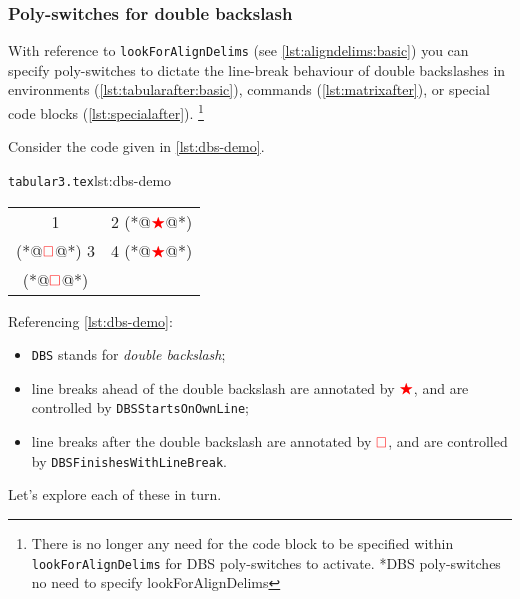 \subsubsection{Poly-switches for double backslash}\label{subsec:dbs}
 With reference to \texttt{lookForAlignDelims} (see \vref{lst:aligndelims:basic})
  you can specify poly-switches to
 dictate the line-break behaviour of double backslashes in environments
 (\vref{lst:tabularafter:basic}), commands (\vref{lst:matrixafter}), or special code
 blocks (\vref{lst:specialafter}). \footnote{There is no longer any need for the code
 block to be specified within \texttt{lookForAlignDelims} for DBS poly-switches to
 activate. *{DBS poly-switches no need to specify
 lookForAlignDelims}} 

 Consider the code given in \cref{lst:dbs-demo}.
 \begin{cmhlistings}[style=tcblatex,escapeinside={(*@}{@*)}]{\texttt{tabular3.tex}}{lst:dbs-demo}
\begin{tabular}{cc}
 1 & 2 (*@$\color{red}\bigstar$@*)\\(*@$\color{red}\square$@*) 3 & 4 (*@$\color{red}\bigstar$@*)\\(*@$\color{red}\square$@*)
\end{tabular}
\end{cmhlistings}
 Referencing \cref{lst:dbs-demo}:
 \begin{itemize}
  \item \texttt{DBS} stands for \emph{double backslash};
  \item line breaks ahead of the double backslash are annotated by
        $\color{red}\bigstar$, and are controlled by \texttt{DBSStartsOnOwnLine};
  \item line breaks after the double backslash are annotated by
        $\color{red}\square$, and are controlled by
        \texttt{DBSFinishesWithLineBreak}.
 \end{itemize}

 Let's explore each of these in turn.

